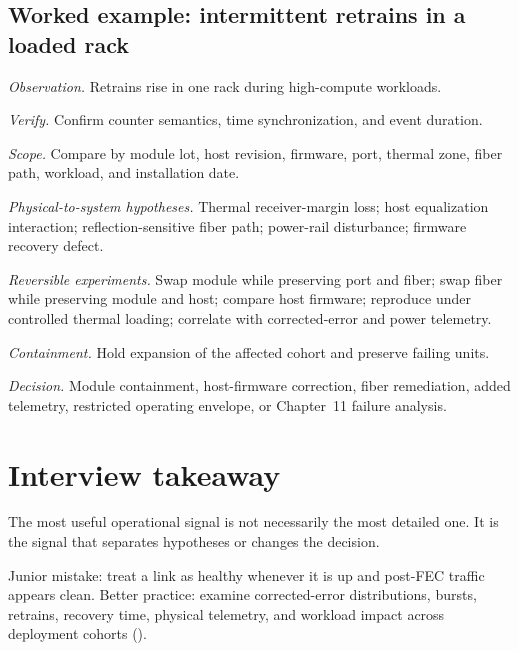 \subsection{Worked example: intermittent retrains in a loaded rack}
\label{sec:ops-worked-retrains}

\textit{Observation.} Retrains rise in one rack during high-compute workloads.

\textit{Verify.} Confirm counter semantics, time synchronization, and event
duration.

\textit{Scope.} Compare by module lot, host revision, firmware, port, thermal
zone, fiber path, workload, and installation date.

\textit{Physical-to-system hypotheses.} Thermal receiver-margin loss; host
equalization interaction; reflection-sensitive fiber path; power-rail
disturbance; firmware recovery defect.

\textit{Reversible experiments.} Swap module while preserving port and fiber;
swap fiber while preserving module and host; compare host firmware; reproduce
under controlled thermal loading; correlate with corrected-error and power
telemetry.

\textit{Containment.} Hold expansion of the affected cohort and preserve
failing units.

\textit{Decision.} Module containment, host-firmware correction, fiber
remediation, added telemetry, restricted operating envelope, or Chapter~11
failure analysis.

\section{Interview takeaway}
\label{sec:networking-design-review}


The most useful operational signal is not necessarily the most detailed one. It
is the signal that separates hypotheses or changes the decision.

Junior mistake: treat a link as healthy whenever it is up and post-FEC traffic
appears clean. Better practice: examine corrected-error distributions, bursts,
retrains, recovery time, physical telemetry, and workload impact across
deployment cohorts
().

